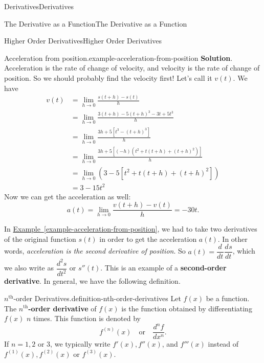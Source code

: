 \documentclass[10pt,]{book}
\newcommand{\terminology}[1]{\textbf{#1}}
\numberwithin{equation}{section}
\newcommand{\dv}[3][]{\dfrac{d^{#1} #2}{d #3^{#1}}}
\begin{document}
\begin{chapterptx}{Derivatives}{}{Derivatives}{}{}
\begin{sectionptx}{The Derivative as a Function}{}{The Derivative as a Function}{}{}
\begin{subsectionptx}{Higher Order Derivatives}{}{Higher Order Derivatives}{}{}
\begin{example}{Acceleration from position.}{example-acceleration-from-position}
\noindent\textbf{Solution}.\hypertarget{solution-25}{}\quad%
\hypertarget{p-117}{}%
Acceleration is the rate of change of velocity, and velocity is the rate of change of position. So we should probably find the velocity first! Let's call it \(v(t)\). We have%
\begin{align*}
v(t) & = \lim_{h\to0}\frac{s(t+h) - s(t)}{h} \\
& = \lim_{h\to0}\frac{3(t+h) - 5(t+h)^{3} - 3t + 5t^{3}}{h} \\
& = \lim_{h\to0}\frac{3h + 5[t^{3} - (t+h)^{3}]}{h} \\
& = \lim_{h\to0}\frac{3h + 5[(-h)(t^{2} + t(t+h) + (t+h)^{2})]}{h} \\
& = \lim_{h\to0}(3 - 5[t^{2} + t(t+h) + (t+h)^{2}]) \\
& = 3 - 15t^{2} 
\end{align*}
Now we can get the acceleration as well:%
\begin{equation*}
a(t) = \lim_{h\to0}\frac{v(t+h) - v(t)}{h} = -30t.
\end{equation*}
%
\end{example}
\hypertarget{p-118}{}%
In \hyperref[example-acceleration-from-position]{Example~\ref{example-acceleration-from-position}}, we had to take two derivatives of the original function \(s(t)\) in order to get the acceleration \(a(t)\). In other words, \emph{acceleration is the second derivative of position}. So \(a(t) = \dv{}{t}\dv{s}{t}\), which we also write as \(\dv[2]{s}{t}\) or \(s''(t)\). This is an example of a \terminology{second-order derivative}. In general, we have the following definition.%
\begin{definition}{\(n^{\text{th}}\)-order Derivatives.}{definition-nth-order-derivatives}%
\hypertarget{p-119}{}%
Let \(f(x)\) be a function. The \terminology{\(n^{\text{th}}\)-order derivative} of \(f(x)\) is the function obtained by differentiating \(f(x)\) \(n\) times. This function is denoted by%
\begin{equation*}
f^{(n)}(x)\quad\text{or}\quad\dv[n]{f}{x}.
\end{equation*}
If \(n=1, 2\) or \(3\), we typically write \(f'(x), f''(x)\), and \(f'''(x)\) instead of \(f^{(1)}(x), f^{(2)}(x)\) or \(f^{(3)}(x)\).%
\end{definition}
\hypertarget{p-120}{}%

\end{subsectionptx}
\end{sectionptx}
\end{chapterptx}
\end{document}
